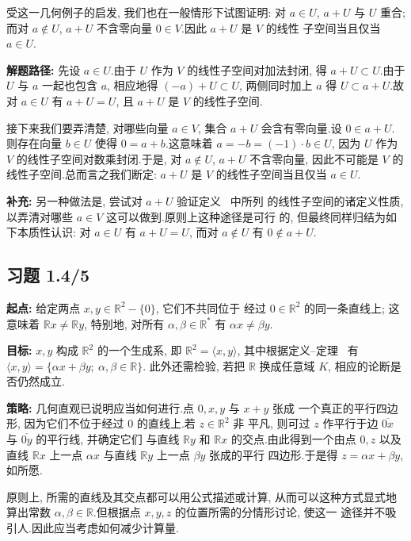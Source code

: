 受这一几何例子的启发, 我们也在一般情形下试图证明: 对 $a \in U$, $a + U$ 与 $U$
重合; 而对 $a \notin U$, $a + U$ 不含零向量 $0 \in V$.因此 $a + U$ 是 $V$ 的线性
子空间当且仅当 $a \in U$.

\noindent\textbf{解题路径:} 先设 $a \in U$.由于 $U$ 作为 $V$ 的线性子空间对加法封闭,
得 $a + U \subset U$.由于 $U$ 与 $a$ 一起也包含 $a$, 相应地得 $(-a) + U \subset U$,
两侧同时加上 $a$ 得 $U \subset a + U$.故对 $a \in U$ 有 $a + U = U$, 且 $a + U$ 是
$V$ 的线性子空间.

接下来我们要弄清楚, 对哪些向量 $a \in V$, 集合 $a + U$ 会含有零向量.设
$0 \in a + U$.则存在向量 $b \in U$ 使得 $0 = a + b$.这意味着
$a = -b = (-1) \cdot b \in U$, 因为 $U$ 作为 $V$ 的线性子空间对数乘封闭.于是, 对
$a \notin U$, $a + U$ 不含零向量, 因此不可能是 $V$ 的线性子空间.总而言之我们断定:
$a + U$ 是 $V$ 的线性子空间当且仅当 $a \in U$.

\noindent\textbf{补充:} 另一种做法是, 尝试对 $a + U$ 验证定义~ 中所列
的线性子空间的诸定义性质, 以弄清对哪些 $a \in V$ 这可以做到.原则上这种途径是可行
的, 但最终同样归结为如下本质性认识: 对 $a \in U$ 有 $a + U = U$, 而对 $a \notin U$
有 $0 \notin a + U$.

\subsection*{习题 1.4/5}

\noindent\textbf{起点:} 给定两点 $x, y \in \mathbb{R}^2 - \{ 0 \}$, 它们不共同位于
经过 $0 \in \mathbb{R}^2$ 的同一条直线上; 这意味着 $\mathbb{R}x \neq \mathbb{R}y$,
特别地, 对所有 $\alpha, \beta \in \mathbb{R}^*$ 有 $\alpha x \neq \beta y$.

\noindent\textbf{目标:} $x, y$ 构成 $\mathbb{R}^2$ 的一个生成系, 即
$\mathbb{R}^2 = \langle x, y \rangle$, 其中根据定义--定理~ 有
$\langle x, y \rangle = \{ \alpha x + \beta y ;\ \alpha, \beta \in \mathbb{R} \}$.
此外还需检验, 若把 $\mathbb{R}$ 换成任意域 $K$, 相应的论断是否仍然成立.

\noindent\textbf{策略:} 几何直观已说明应当如何进行.点 $0, x, y$ 与 $x + y$ 张成
一个真正的平行四边形, 因为它们不位于经过 $0$ 的直线上.若 $z \in \mathbb{R}^2$ 非
平凡, 则可过 $z$ 作平行于边 $\overline{0x}$ 与 $\overline{0y}$ 的平行线, 并确定它们
与直线 $\mathbb{R}y$ 和 $\mathbb{R}x$ 的交点.由此得到一个由点 $0, z$ 以及直线
$\mathbb{R}x$ 上一点 $\alpha x$ 与直线 $\mathbb{R}y$ 上一点 $\beta y$ 张成的平行
四边形.于是得 $z = \alpha x + \beta y$, 如所愿.

原则上, 所需的直线及其交点都可以用公式描述或计算, 从而可以这种方式显式地算出常数
$\alpha, \beta \in \mathbb{R}$.但根据点 $x, y, z$ 的位置所需的分情形讨论, 使这一
途径并不吸引人.因此应当考虑如何减少计算量.

